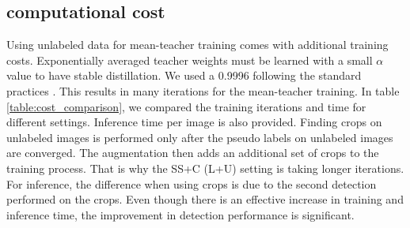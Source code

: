 \begin{table}
    \caption{Performance comparison with the fully supervised upper-bound on the VisDrone dataset with 10\% labeled images.}
    \centering
    \label{table:sup_upperbound_ssod_comp}
\end{table}


\subsection{computational cost}
Using unlabeled data for mean-teacher training comes with additional training costs. Exponentially averaged teacher weights must be learned with a small $\alpha$ value to have stable distillation. We used a 0.9996 following the standard practices \cite{unbiased-teacher-Liu-2021, humble-teacher-Yang-2021}. This results in many iterations for the mean-teacher training. In table \ref{table:cost_comparison}, we compared the training iterations and time for different settings. Inference time per image is also provided. Finding crops on unlabeled images is performed only after the pseudo labels on unlabeled images are converged. The augmentation then adds an additional set of crops to the training process. That is why the SS+C (L+U) setting is taking longer iterations. For inference, the difference when using crops is due to the second detection performed on the crops. Even though there is an effective increase in training and inference time, the improvement in detection performance is significant.

